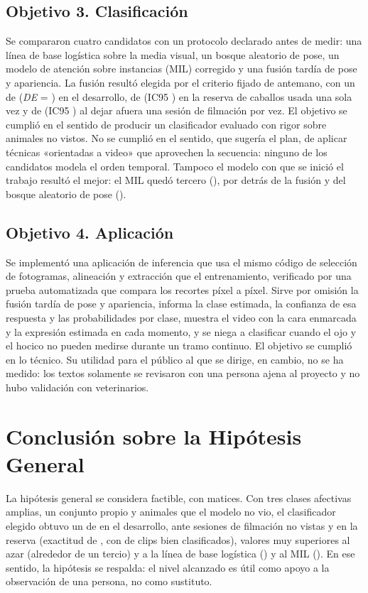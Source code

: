\subsection{Objetivo 3. Clasificación}
Se compararon cuatro candidatos con un protocolo declarado antes de medir: una línea de base logística sobre la media visual, un bosque aleatorio de pose, un modelo de atención sobre instancias (MIL) corregido y una fusión tardía de pose y apariencia. La fusión resultó elegida por el criterio fijado de antemano, con un \fmacro{} de \FusionDevF{} (\textit{DE} = \FusionDevDE{}) en el desarrollo, de \FusionReservaF{} (IC95 \FusionReservaIC{}) en la reserva de caballos usada una sola vez y de \FusionSesionF{} (IC95 \FusionSesionIC{}) al dejar afuera una sesión de filmación por vez. El objetivo se cumplió en el sentido de producir un clasificador evaluado con rigor sobre animales no vistos. No se cumplió en el sentido, que sugería el plan, de aplicar técnicas «orientadas a video» que aprovechen la secuencia: ninguno de los candidatos modela el orden temporal. Tampoco el modelo con que se inició el trabajo resultó el mejor: el MIL quedó tercero (\MILDevF{}), por detrás de la fusión y del bosque aleatorio de pose (\RFPoseDevF{}).

\subsection{Objetivo 4. Aplicación}
Se implementó una aplicación de inferencia que usa el mismo código de selección de fotogramas, alineación y extracción que el entrenamiento, verificado por una prueba automatizada que compara los recortes píxel a píxel. Sirve por omisión la fusión tardía de pose y apariencia, informa la clase estimada, la confianza de esa respuesta y las probabilidades por clase, muestra el video con la cara enmarcada y la expresión estimada en cada momento, y se niega a clasificar cuando el ojo y el hocico no pueden medirse durante un tramo continuo. El objetivo se cumplió en lo técnico. Su utilidad para el público al que se dirige, en cambio, no se ha medido: los textos solamente se revisaron con una persona ajena al proyecto y no hubo validación con veterinarios.

\section{Conclusión sobre la Hipótesis General}
La hipótesis general se considera factible, con matices. Con tres clases afectivas amplias, un conjunto propio y animales que el modelo no vio, el clasificador elegido obtuvo un \fmacro{} de \FusionDevF{} en el desarrollo, \FusionSesionF{} ante sesiones de filmación no vistas y \FusionReservaF{} en la reserva (exactitud de \FusionReservaAcc{}, con \ReservaAciertos{} de \ClipsReserva{} clips bien clasificados), valores muy superiores al azar (alrededor de un tercio) y a la línea de base logística (\BaseDevF{}) y al MIL (\MILDevF{}). En ese sentido, la hipótesis se respalda: el nivel alcanzado es útil como apoyo a la observación de una persona, no como sustituto.

